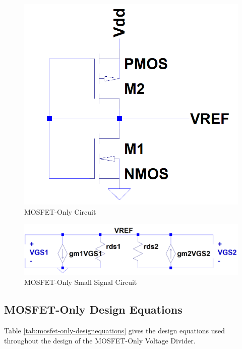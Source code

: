 \documentclass[conference]{IEEEtran}
\begin{document}
\begin{figure}[!htbp]
  \centering
  \includegraphics[scale=0.25]{images/mosfet-only1.png}
  \caption[mosfet-only1]{MOSFET-Only Circuit}
  \label{fig:mosfet-only1}
\end{figure}

\begin{figure}[!htbp]
  \centering
  \includegraphics[scale=0.25]{images/mosfet-only1-ss.png}
  \caption[mosfet-only1-ss]{MOSFET-Only Small Signal Circuit}
  \label{fig:mosfet-only1-ss}
\end{figure}
\subsection{MOSFET-Only Design Equations}
Table \ref{tab:mosfet-only-designequations} gives the design equations used throughout the design of the MOSFET-Only Voltage Divider.
\end{document}

